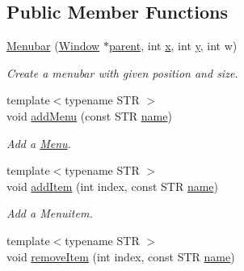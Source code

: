 \subsection*{Public Member Functions}
\begin{DoxyCompactItemize}
\item 
\hyperlink{classGUI_1_1Menubar_aa7725739cae57cf805cd2db7060da701}{Menubar} (\hyperlink{classGUI_1_1Window}{Window} $\ast$\hyperlink{classGUI_1_1Window_a2e593ff65e7702178d82fe9010a0b539}{parent}, int \hyperlink{classGUI_1_1Window_a6ca6a80ca00c9e1d8ceea8d3d99a657d}{x}, int \hyperlink{classGUI_1_1Window_a0ee8e923aff2c3661fc2e17656d37adf}{y}, int w)
\begin{DoxyCompactList}\small\item\em Create a menubar with given position and size. \end{DoxyCompactList}\item 
\hypertarget{classGUI_1_1Menubar_a036a629ef29cbfc16d07ab8f19a3af49}{{\footnotesize template$<$typename S\-T\-R $>$ }\\void \hyperlink{classGUI_1_1Menubar_a036a629ef29cbfc16d07ab8f19a3af49}{add\-Menu} (const S\-T\-R \hyperlink{classGUI_1_1ActionEventSource_ab494e66ccff6518e1cabe747df2173f8}{name})}\label{classGUI_1_1Menubar_a036a629ef29cbfc16d07ab8f19a3af49}

\begin{DoxyCompactList}\small\item\em Add a \hyperlink{classGUI_1_1Menu}{Menu}. \end{DoxyCompactList}\item 
\hypertarget{classGUI_1_1Menubar_a4158b1ea17964f5705ef70b67af42475}{{\footnotesize template$<$typename S\-T\-R $>$ }\\void \hyperlink{classGUI_1_1Menubar_a4158b1ea17964f5705ef70b67af42475}{add\-Item} (int index, const S\-T\-R \hyperlink{classGUI_1_1ActionEventSource_ab494e66ccff6518e1cabe747df2173f8}{name})}\label{classGUI_1_1Menubar_a4158b1ea17964f5705ef70b67af42475}

\begin{DoxyCompactList}\small\item\em Add a Menuitem. \end{DoxyCompactList}\item 
\hypertarget{classGUI_1_1Menubar_a7ac91480baf9db26ce786ec16f36e90a}{{\footnotesize template$<$typename S\-T\-R $>$ }\\void \hyperlink{classGUI_1_1Menubar_a7ac91480baf9db26ce786ec16f36e90a}{remove\-Item} (int index, const S\-T\-R \hyperlink{classGUI_1_1ActionEventSource_ab494e66ccff6518e1cabe747df2173f8}{name})}\label{classGUI_1_1Menubar_a7ac91480baf9db26ce786ec16f36e90a}


\end{DoxyCompactItemize}
